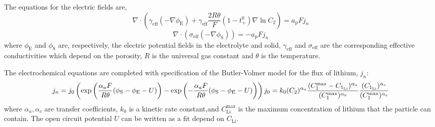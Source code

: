 The equations for the electric fields are, \[ \nabla\cdot\left(\gamma_\text{eff}(-\nabla\phi_\text{E})+\gamma_\text{eff}\frac{2R\theta}{F}(1-t^{0}_{+})\nabla\ln C_{2}\right)=a_\text{p}Fj_{n} \] \[ \nabla\cdot\left(\sigma_\text{eff}(-\nabla\phi_\text{S})\right)=-a_\text{p}Fj_{n} \] where $\phi_\text{E}$ and $\phi_\text{S}$ are, respectively, the electric potential fields in the electrolyte and solid, $\gamma_\text{eff}$ and $\sigma_\text{eff}$ are the corresponding effective conductivities which depend on the porosity, $R$ is the universal gas constant and $\theta$ is the temperature.

The electrochemical equations are completed with specification of the Butler-\/\+Volmer model for the flux of lithium, $j_n$\+: \[ j_n=j_0\left(\text{exp}\left(\frac{\alpha_aF}{R\theta}(\phi_\text{S}-\phi_\text{E}-U)\right)-\text{exp}\left(-\frac{\alpha_aF}{R\theta}(\phi_\text{S}-\phi_\text{E}-U)\right)\right)\\ j_0=k_0(C_2)^{\alpha_a} \frac{(C_1^{\text{max}}-C_{1_\text{Li}})^{\alpha_a}}{(C_1^{\text{max}})^{\alpha_a}} \frac{(C_{1_\text{Li}})^{\alpha_c}}{{(C_1^\text{max}})^{\alpha_c}} \] where $\alpha_a, \alpha_c$ are transfer coefficients, $k_0$ is a kinetic rate constant,and $C^{\text{max}}_\text{Li}$ is the maximum concentration of lithium that the particle can contain. The open circuit potential $U$ can be written as a fit depend on $C_\text{Li}$.

